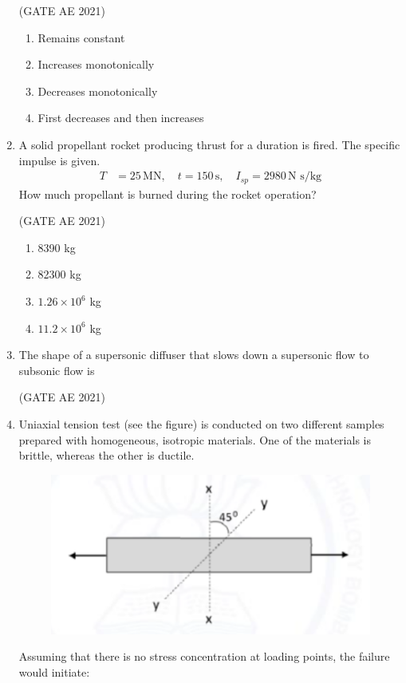 \documentclass[journal,12pt,onecolumn]{IEEEtran}
\theoremstyle{remark}
\begin{document}
\begin{flushleft}
\begin{enumerate}
\hfill (GATE AE 2021)

\begin{enumerate}
\item Remains constant
\item Increases monotonically
\item Decreases monotonically
\item First decreases and then increases
\end{enumerate}

\item 
A solid propellant rocket producing thrust for a duration is fired. The specific impulse is given. 
\begin{align*}
T &= 25\,\text{MN}, \quad t = 150\,\text{s}, \quad I_{sp} = 2980\,\text{N s/kg}
\end{align*}
How much propellant is burned during the rocket operation?

\hfill (GATE AE 2021)

\begin{enumerate}
\item 8390 kg
\item 82300 kg
\item $1.26 \times 10^{6}$ kg
\item $11.2 \times 10^{6}$ kg
\end{enumerate}
\item 
The shape of a supersonic diffuser that slows down a supersonic flow to subsonic flow is

\hfill (GATE AE 2021)

\begin{enumerate}
\end{enumerate}

\item 
Uniaxial tension test (see the figure) is conducted on two different samples prepared with homogeneous, isotropic materials. One of the materials is brittle, whereas the other is ductile.
\begin{figure}[H]
    \centering
    \includegraphics[width=0.5\columnwidth]{figs/qq.png}
    \caption{}
    \label{fig:placeholder}
\end{figure}
Assuming that there is no stress concentration at loading points, the failure would initiate:


\end{enumerate}
\end{flushleft}
\end{document}
